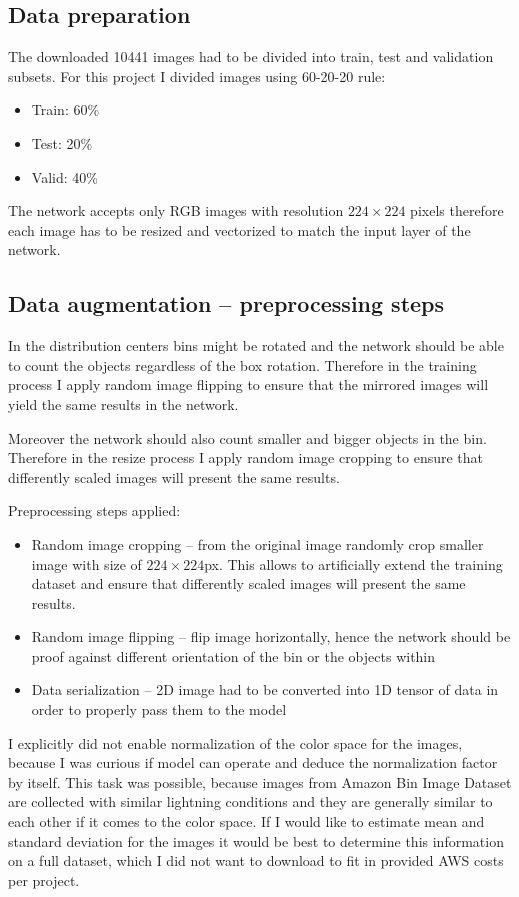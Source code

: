 \documentclass{article}
\begin{document}
\subsection{Data preparation}
The downloaded 10441 images had to be divided into train, test and validation subsets. For this project I divided images using 60-20-20 rule:
\begin{itemize}
	\item Train: 60\%
	\item Test: 20\%
	\item Valid: 40\%
\end{itemize}

The network accepts only RGB images with resolution $224\times224$ pixels therefore each image has to be resized and vectorized to match the input layer of the network.

\subsection{Data augmentation -- preprocessing steps}
In the distribution centers bins might be rotated and the network should be able to count the objects regardless of the box rotation. Therefore in the training process I apply random image flipping to ensure that the mirrored images will yield the same results in the network. 

Moreover the network should also count smaller and bigger objects in the bin. Therefore in the resize process I apply random image cropping to ensure that differently scaled images will present the same results.

Preprocessing steps applied:
\begin{itemize}
	\item Random image cropping -- from the original image randomly crop smaller image with size of $224\times224$px. This allows to artificially extend the training dataset and ensure that differently scaled images will present the same results.
	\item Random image flipping -- flip image horizontally, hence the network should be proof against different orientation of the bin or the objects within
	\item Data serialization -- 2D image had to be converted into 1D tensor of data in order to properly pass them to the model
\end{itemize}

I explicitly did not enable normalization of the color space for the images, because I was curious if model can operate and deduce the normalization factor by itself. This task was possible, because images from Amazon Bin Image Dataset are collected with similar lightning conditions and they are generally similar to each other if it comes to the color space. If I would like to estimate mean and standard deviation for the images it would be best to determine this information on a full dataset, which I did not want to download to fit in provided AWS costs per project.
\end{document}

